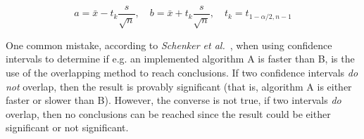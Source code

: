 \begin{equation} a = \bar{x} - t_k\frac{s}{\sqrt{n}}, \quad
   b = \bar{x} + t_k\frac{s}{\sqrt{n}}, \quad
t_k = t_{1-\alpha/2,n-1} \end{equation}

One common mistake, according to \emph{Schenker et al.}~\cite{schenker2001judging}, when using confidence intervals to determine if e.g. an implemented algorithm A is faster than B, is the use of the overlapping method to reach conclusions. If two confidence intervals \emph{do not} overlap, then the result is provably significant (that is, algorithm A is either faster or slower than B). However, the converse is not true, if two intervals \emph{do} overlap, then no conclusions can be reached since the result could be either significant or not significant.


